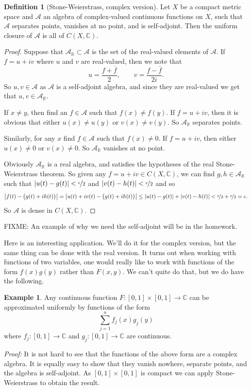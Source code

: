 \documentclass[12pt]{book}
\newcommand{\abs}[1]{\left\lvert {#1} \right\rvert}
\newcommand{\C}{{\mathbb{C}}}
\newcommand{\R}{{\mathbb{R}}}
\newcommand{\sA}{{\mathcal{A}}}
\theoremstyle{plain}
\theoremstyle{remark}
\theoremstyle{definition}
\newtheorem{defn}[thm]{Definition}
\theoremstyle{exercise}
\theoremstyle{example}
\newtheorem{example}[thm]{Example}
\begin{document}
\begin{defn}[Stone-Weierstrass, complex version]
Let $X$ be a compact metric space and $\sA$ an algebra of complex-valued
continuous functions on $X$, such that $\sA$ separates points, vanishes at
no point, and is self-adjoint.  Then the uniform closure of $\sA$ is all of
$C(X,\C)$.
\end{defn}

\begin{proof}
Suppose that $\sA_\R \subset \sA$ is the set of the real-valued elements of
$\sA$.  If $f = u+iv$ where $u$ and $v$ are real-valued, then we note that
$$
u = \frac{f+\bar{f}}{2}, \qquad
v = \frac{f-\bar{f}}{2i} .
$$
So $u, v \in \sA$ as $\sA$ is a self-adjoint algebra, and since they are
real-valued we get that $u, v \in \sA_\R$.

If $x \not= y$, then find an $f \in \sA$ such that $f(x) \not= f(y)$.  If $f
= u+iv$, then it is obvious that either $u(x) \not= u(y)$ or $v(x) \not=
v(y)$.  So $\sA_\R$ separates points.

Similarly, for any $x$ find $f \in \sA$ such that $f(x) \not= 0$.  If $f
= u+iv$, then either $u(x) \not= 0$ or $v(x) \not= 0$.
So $\sA_\R$ vanishes at no point.

Obviously $\sA_\R$ is a real algebra, and satisfies the hypotheses of the
real Stone-Weierstrass theorem.  So given any $f = u+iv \in C(X,\C)$,
we can find $g,h \in \sA_\R$ such that
$\abs{u(t)-g(t)} < \nicefrac{\epsilon}{2}$ and
$\abs{v(t)-h(t)} < \nicefrac{\epsilon}{2}$ and so
$$
\abs{f(t) - \bigl(g(t)+ih(t)\bigr)} = 
\abs{u(t)+iv(t) - \bigl(g(t)+ih(t)\bigr)} \leq
\abs{u(t)-g(t)}+\abs{v(t)-h(t)} < \nicefrac{\epsilon}{2} +
\nicefrac{\epsilon}{2} = \epsilon.
$$
So $\sA$ is dense in $C(X,\C)$.
\end{proof}

FIXME: An example of why we need the self-adjoint will be in the homework.

Here is an interesting application.  We'll do it for the complex version, but
the same thing can be done with the real version.  It turns out when working
with functions of two variables, one would really like to work with functions
of the form $f(x)g(y)$ rather than $F(x,y)$.  We can't quite do that, but we
do have the following.

\begin{example}
Any continuous function $F \colon [0,1] \times [0,1] \to \C$ can be
approximated uniformly by functions of the form
$$
\sum_{j=1}^n f_j(x) g_j(y)
$$
where $f_j \colon [0,1] \to \C$ and $g_j \colon [0,1] \to \C$ are continuous.

\emph{Proof:}
It is not hard to see that the functions of the above form are a complex
algebra.  It is equally easy to show that they vanish nowhere, separate
points, and the algebra is self-adjoint.  As $[0,1] \times [0,1]$ is compact
we can apply Stone-Weierstrass to obtain the result.
\end{example}
\end{document}
